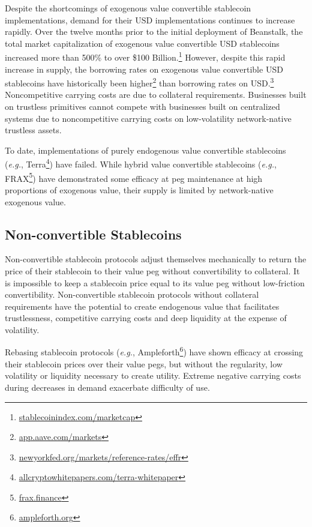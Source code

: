 \documentclass[tikz]{article}
\newcommand{\term}[1]{\textsl{#1}}
\newcommand{\fref}[1]{\footnote{\href{http://#1}{#1}}}
\begin{document}
Despite the shortcomings of exogenous value convertible stablecoin implementations, demand for their USD implementations continues to increase rapidly. Over the twelve months prior to the initial deployment of Beanstalk, the total market capitalization of exogenous value convertible USD stablecoins increased more than 500\% to over \$100 Billion.\fref{stablecoinindex.com/marketcap} However, despite this rapid increase in supply, the borrowing rates on exogenous value convertible USD stablecoins have historically been higher\fref{app.aave.com/markets} than borrowing rates on USD.\fref{newyorkfed.org/markets/reference-rates/effr} Noncompetitive carrying costs are due to collateral requirements. Businesses built on trustless primitives cannot compete with businesses built on centralized systems due to noncompetitive carrying costs on low-volatility network-native trustless assets.

To date, implementations of purely endogenous value convertible stablecoins (\term{e.g.}, Terra\fref{allcryptowhitepapers.com/terra-whitepaper}) have failed. While hybrid value convertible stablecoins (\term{e.g.}, FRAX\fref{frax.finance}) have demonstrated some efficacy at peg maintenance at high proportions of exogenous value, their supply is limited by network-native exogenous value. 


\vspace*{-1.5mm}
\subsection{Non-convertible Stablecoins}
\vspace*{-1.5mm}

Non-convertible stablecoin protocols adjust themselves mechanically to return the price of their stablecoin to their value peg without convertibility to collateral. It is impossible to keep a stablecoin price equal to its value peg without low-friction convertibility. Non-convertible stablecoin protocols without collateral requirements have the potential to create endogenous value that facilitates trustlessness, competitive carrying costs and deep liquidity at the expense of volatility. 

Rebasing stablecoin protocols (\term{e.g.}, Ampleforth\fref{ampleforth.org}) have shown efficacy at crossing their stablecoin prices over their value pegs, but without the regularity, low volatility or liquidity necessary to create utility. Extreme negative carrying costs during decreases in demand exacerbate difficulty of use.
\end{document}
